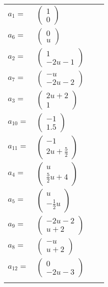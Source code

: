 \documentclass[1p]{elsarticle_modified}
\theoremstyle{definition}
\begin{document}
\begin{tabular}{m{7pt} m{180pt} m{7pt} m{180pt} }
\flushright $a_{1}=$&$\begin{pmatrix}1\\0\end{pmatrix}$ \\
\flushright $a_{6}=$&$\begin{pmatrix}0\\u\end{pmatrix}$ \\
\flushright $a_{2}=$&$\begin{pmatrix}1\\-2 u-1\end{pmatrix}$ \\
\flushright $a_{7}=$&$\begin{pmatrix}- u\\-2 u-2\end{pmatrix}$ \\
\flushright $a_{3}=$&$\begin{pmatrix}2 u+2\\1\end{pmatrix}$ \\
\flushright $a_{10}=$&$\begin{pmatrix}-1\\1.5\end{pmatrix}$ \\
\flushright $a_{11}=$&$\begin{pmatrix}-1\\2 u+\frac{5}{2}\end{pmatrix}$ \\
\flushright $a_{4}=$&$\begin{pmatrix}u\\\frac{5}{2} u+4\end{pmatrix}$ \\
\flushright $a_{5}=$&$\begin{pmatrix}u\\-\frac{1}{2} u\end{pmatrix}$ \\
\flushright $a_{9}=$&$\begin{pmatrix}-2 u-2\\u+2\end{pmatrix}$ \\
\flushright $a_{8}=$&$\begin{pmatrix}- u\\u+2\end{pmatrix}$ \\
\flushright $a_{12}=$&$\begin{pmatrix}0\\-2 u-3\end{pmatrix}$\\&\end{tabular}
\end{document}
